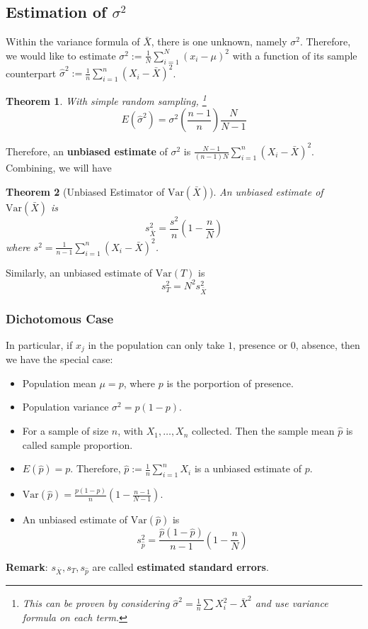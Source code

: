 \documentclass[12pt]{article}
\newcommand{\var}{\mathrm{Var}}
\newtheorem{theorem}{Theorem}[section]
\theoremstyle{definition}
\begin{document}
\subsection{Estimation of {$\sigma^2$}}
Within the variance formula of $\bar{X}$, there is one unknown, namely $\sigma^2$. Therefore, we would like to estimate $\sigma^2:=\frac{1}{N} \sum_{i=1}^N (x_i-\mu)^2$ with a function of its sample counterpart $\hat{\sigma}^2:=\frac{1}{n}\sum_{i=1}^n (X_i-\bar{X})^2$.
\begin{theorem}
\normalfont With simple random sampling, \footnote{This can be proven by considering $\hat{\sigma}^2 = \frac{1}{n}\sum X_i^2 - \bar{X}^2$ and use variance formula on each term.}
\[
E(\hat{\sigma}^2) = \sigma^2(\frac{n-1}{n})\frac{N}{N-1}
\]
\end{theorem}
Therefore, an \textbf{unbiased estimate} of $\sigma^2$ is $\frac{N-1}{(n-1)N}\sum_{i=1}^n (X_i-\bar{X})^2$.\\

Combining, we will have
\begin{theorem}[Unbiased Estimator of {$\var(\bar{X})$}]
\normalfont An unbiased estimate of $\var(\bar{X})$ is
\[
s_{\bar{X}}^2 = \frac{s^2}{n}(1-\frac{n}{N})
\]
where $s^2 = \frac{1}{n-1}\sum_{i=1}^n (X_i-\bar{X})^2$.
\end{theorem}
Similarly, an unbiased estimate of $\var(T)$ is
\[
s_T^2 = N^2 s^2_{\bar{X}}
\]
\subsubsection{Dichotomous Case}
In particular, if $x_j$ in the population can only take $1$, presence or $0$, absence, then we have the special case:
\begin{itemize}
  \item Population mean $\mu=p$, where $p$ is the porportion of presence.
  \item Population variance $\sigma^2 = p(1-p)$.
  \item For a sample of size $n$, with $X_1,\ldots, X_n$ collected. Then the sample mean $\hat{p}$ is called sample proportion.
  \item $E(\hat{p}) = p$. Therefore, $\hat{p}:=\frac{1}{n}\sum_{i=1}^n X_i$ is a unbiased estimate of $p$. 
  \item $\var(\hat{p}) = \frac{p(1-p)}{n}(1-\frac{n-1}{N-1})$.
  \item An unbiased estimate of $\var(\hat{p})$ is
  \[
s_{\hat{p}}^2 = \frac{\hat{p}(1-\hat{p})}{n-1}(1-\frac{n}{N})
  \]
\end{itemize}
\textbf{Remark}: $s_{\bar{X}}, s_T, s_{\hat{p}}$ are called \textbf{estimated standard errors}.
\end{document}
